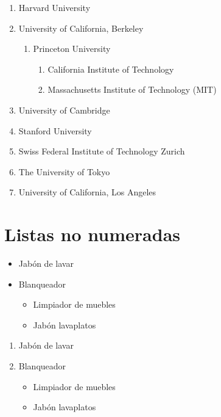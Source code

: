 \documentclass[11pt,a4paper]{report}
\begin{document}
\begin{enumerate}
\item Harvard University
\item University of California, Berkeley

  \begin{enumerate}


  \item Princeton University
\begin{enumerate}
  \item California Institute of Technology

  \item Massachusetts Institute of Technology (MIT)
 \end{enumerate}
  \end{enumerate} 

\item University of Cambridge

\item Stanford University

\item Swiss Federal Institute of Technology Zurich

\item The University of Tokyo

\item University of California, Los Angeles
\end{enumerate}

\section{Listas no numeradas}

\begin{itemize}
\item Jabón de lavar

\item Blanqueador
\begin{itemize}
\item Limpiador de muebles

\item Jabón lavaplatos
\end{itemize}
\end{itemize}
\begin{enumerate}
\item Jabón de lavar

\item Blanqueador
\begin{itemize}
\item Limpiador de muebles

\item Jabón lavaplatos
\end{itemize}
\end{enumerate}
\end{document}
